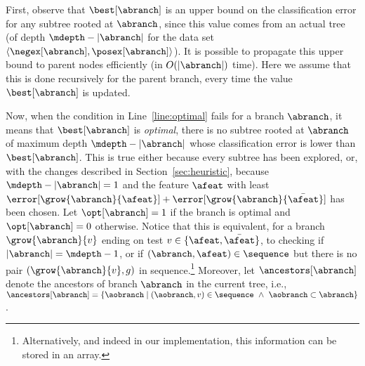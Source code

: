 \documentclass{article}
\begin{document}




First, observe that $\best[\abranch]$ is an upper bound on the classification error for any subtree rooted at $\abranch$, since this value comes from an actual tree (of depth $\mdepth - |\abranch|$ for the data set $\langle \negex[\abranch],\posex[\abranch] \rangle$). It is possible to propagate this upper bound to parent nodes efficiently (in $O(|\abranch|)$ time). Here we assume that this is done recursively for the parent branch, every time the value $\best[\abranch]$ is  updated. %


Now, when the condition in Line~\ref{line:optimal} fails for a branch $\abranch$, it means that $\best[\abranch]$ is \emph{optimal}, there is no subtree rooted at $\abranch$ of maximum depth $\mdepth - |\abranch|$ whose classification error is lower than $\best[\abranch]$. This is true either because every subtree has been explored, or, with the changes described in Section~\ref{sec:heuristic}, because $\mdepth - |\abranch| = 1$ and the feature $\afeat$ with least 
$\error[\grow{\abranch}{\afeat}] + \error[\grow{\abranch}{\bar{\afeat}}]$
has been chosen. 
Let $\opt[\abranch]=1$ if the branch is optimal and $\opt[\abranch]=0$ otherwise. Notice that this is equivalent, for a branch $\grow{\abranch}{v}$ ending on test $v \in \{\afeat,\bar{\afeat}\}$, to checking if $|\abranch|=\mdepth-1$, or if $(\abranch,\afeat) \in \sequence$ but there is no pair $(\grow{\abranch}{v}, g)$ in sequence.\footnote{Alternatively, and indeed in our implementation, this information can be stored in an array.}
Moreover, let $\ancestors[\abranch]$ denote the ancestors of branch $\abranch$ in the current tree, i.e., $\ancestors[\abranch] = \{\aobranch \mid (\aobranch,v) \in \sequence ~\wedge~ \aobranch \subset \abranch\}$.


\end{document}
